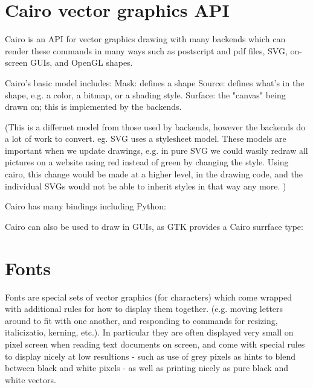 \documentclass[oneside,english]{scrbook}
\begin{document}


\section{Cairo vector graphics API}

Cairo is an API for vector graphics drawing with many backends which can render these commands in many ways such as postscript and pdf files, SVG, on-screen GUIs, and OpenGL shapes.

Cairo's basic model includes:
Mask: defines a shape
Source: defines what's in the shape, e.g. a color, a bitmap, or a shading style.
Surface: the "canvas" being drawn on; this is implemented by the backends.

(This is a differnet model from those used by backends, however the backends do a lot of work to convert. eg. SVG uses a stylesheet model.  These models are important when we update drawings, e.g. in pure SVG we could wasily redraw all pictures on a website using red instead of green by changing the style. Using cairo, this change would be made at a higher level, in the drawing code, and the individual SVGs would not be able to inherit styles in that way any more. )



Cairo has many bindings including Python:



Cairo can also be used to draw in GUIs, as GTK provides a Cairo surrface type:



\section{Fonts}

Fonts are special sets of vector graphics (for characters) which come wrapped with additional rules for how to display them together. (e.g. moving letters around to fit with one another, and responding to commands for resizing, italicizatio, kerning, etc.). In particular they are often displayed very small on pixel screen when reading text documents on screen, and come with special rules to display nicely at low resultions - such as use of grey pixels as hints to blend between black and white pixels - as well as printing nicely as pure black and white vectors.
\end{document}
